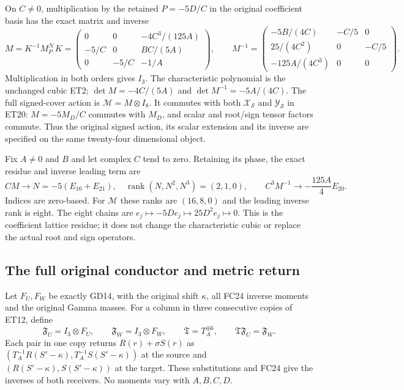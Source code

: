 \documentclass[11pt]{article}
\newcommand{\rank}{\operatorname{rank}}
\begin{document}
On $C\ne0$, multiplication by the retained $P=-5D/C$ in the
original coefficient basis has the exact matrix and inverse
\[
 M=K^{-1}M_P^{\mathscr N}K
 =\begin{pmatrix}
 0&0&-4C^3/(125A)\\-5/C&0&BC/(5A)\\0&-5/C&-1/A
 \end{pmatrix},
 \qquad
 M^{-1}=\begin{pmatrix}
 -5B/(4C)&-C/5&0\\25/(4C^2)&0&-C/5\\-125A/(4C^3)&0&0
 \end{pmatrix}.
 \tag{ET21}
\]
Multiplication in both orders gives $I_3$.
The characteristic polynomial is the unchanged cubic ET2;
$\det M=-4C/(5A)$ and $\det M^{-1}=-5A/(4C)$.
The full signed-cover action is $\mathcal M=M\otimes I_8$.
It commutes with both $\mathcal X_{\mathscr S}$ and
$\mathcal Y_{\mathscr S}$ in ET20: $M=-5M_D/C$ commutes with
$M_D$, and scalar and root/sign tensor factors commute.
Thus the original signed action, its scalar extension and its inverse
are specified on the same twenty-four dimensional object.

Fix $A\ne0$ and $B$ and let complex $C$ tend to zero.
Retaining its phase, the exact residue and inverse leading term are
\[
 C M\longrightarrow N=-5(E_{10}+E_{21}),\quad
 \rank(N,N^2,N^3)=(2,1,0),\qquad
 C^3M^{-1}\longrightarrow-\frac{125A}{4}E_{20}.
 \tag{ET22}
\]
Indices are zero-based. For $\mathcal M$ these ranks are
$(16,8,0)$ and the leading inverse rank is eight.
The eight chains are $e_j\mapsto-5De_j\mapsto25D^2e_j\mapsto0$.
This is the coefficient lattice residue; it does not change the
characteristic cubic or replace the actual root and sign operators.

\subsection{The full original conductor and metric return}
Let $F_U,F_W$ be exactly GD14, with the original shift $\kappa$,
all FC24 inverse moments and the original Gamma masses.
For a column in three consecutive copies of ET12, define
\[
 \mathfrak F_U=I_3\otimes F_U,\qquad
 \mathfrak F_W=I_3\otimes F_W,\qquad
 \mathfrak T=T_A^{\oplus6},\qquad
 \mathfrak T\mathfrak F_U=\mathfrak F_W .
 \tag{ET23}
\]
Each pair in one copy returns $R(r)+\sigma S(r)$ as
$(T_A^{-1}R(S'-\kappa),T_A^{-1}S(S'-\kappa))$ at the source
and $(R(S'-\kappa),S(S'-\kappa))$ at the target.
These substitutions and FC24 give the inverses of both receivers.
No moments vary with $A,B,C,D$.
\end{document}
